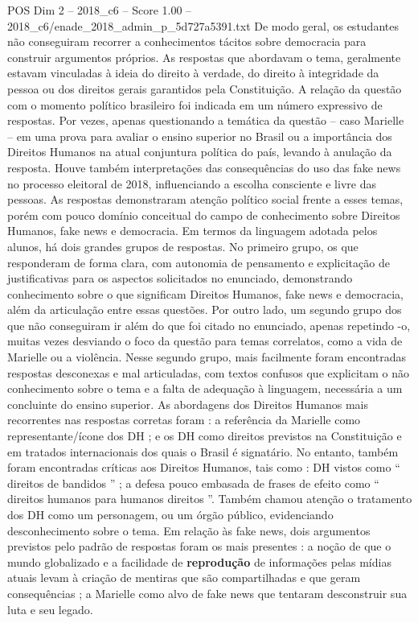 \begin{textsample}{POS Dim 2 – 2018\_c6 – Score 1.00 – 2018\_c6/enade\_2018\_admin\_p\_5d727a5391.txt}
De modo geral, os estudantes não conseguiram recorrer a conhecimentos tácitos sobre democracia para construir argumentos próprios.
As respostas que abordavam o tema, geralmente estavam vinculadas à ideia do direito à verdade, do direito à integridade da pessoa ou dos direitos gerais garantidos pela Constituição.
A relação da questão com o momento político brasileiro foi indicada em um número expressivo de respostas.
Por vezes, apenas questionando a temática da questão – caso Marielle – em uma prova para avaliar o ensino superior no Brasil ou a importância dos Direitos Humanos na atual conjuntura política do país, levando à anulação da resposta.
Houve também interpretações das consequências do uso das fake news no processo eleitoral de 2018, influenciando a escolha consciente e livre das pessoas.
As respostas demonstraram atenção político social frente a esses temas, porém com pouco domínio conceitual do campo de conhecimento sobre Direitos Humanos, fake news e democracia.
Em termos da linguagem adotada pelos alunos, há dois grandes grupos de respostas.
No primeiro grupo, os que responderam de forma clara, com autonomia de pensamento e explicitação de justificativas para os aspectos solicitados no enunciado, demonstrando conhecimento sobre o que significam Direitos Humanos, fake news e democracia, além da articulação entre essas questões.
Por outro lado, um segundo grupo dos que não conseguiram ir além do que foi citado no enunciado, apenas repetindo -o, muitas vezes desviando o foco da questão para temas correlatos, como a vida de Marielle ou a violência.
Nesse segundo grupo, mais facilmente foram encontradas respostas desconexas e mal articuladas, com textos confusos que explicitam o não conhecimento sobre o tema e a falta de adequação à linguagem, necessária a um concluinte do ensino superior.
As abordagens dos Direitos Humanos mais recorrentes nas respostas corretas foram : a referência da Marielle como representante/ícone dos DH ; e os DH como direitos previstos na Constituição e em tratados internacionais dos quais o Brasil é signatário.
No entanto, também foram encontradas críticas aos Direitos Humanos, tais como : DH vistos como “ direitos de bandidos ” ; a defesa pouco embasada de frases de efeito como “ direitos humanos para humanos direitos ”.
Também chamou atenção o tratamento dos DH como um personagem, ou um órgão público, evidenciando desconhecimento sobre o tema.
Em relação às fake news, dois argumentos previstos pelo padrão de respostas foram os mais presentes : a noção de que o mundo globalizado e a facilidade de \textbf{reprodução} de informações pelas mídias atuais levam à criação de mentiras que são compartilhadas e que geram consequências ; a Marielle como alvo de fake news que tentaram desconstruir sua luta e seu legado.

\end{textsample}

